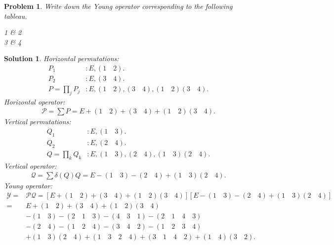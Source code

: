 \documentclass[UTF8,10pt,a4paper]{article}
\theoremstyle{Problem}
\newtheorem{prob}{Problem}
\theoremstyle{Solution}
\newtheorem*{sol}{Solution}
\begin{document}
\begin{prob}
    Write down the Young operator corresponding to the following tableau.\\
    \begin{center}
        \begin{ytableau}
            1 & 2 \\
            3 & 4
        \end{ytableau}
    \end{center}
\end{prob}
\begin{sol}
    Horizontal permutations:
    \begin{align}
        P_1&:E,(1\quad 2).\\
        P_2&:E,(3\quad 4).\\
        P=\prod_jP_j&:E,(1\quad 2),(3\quad 4),(1\quad 2)(3\quad 4).
    \end{align}
    Horizontal operator:
    \begin{align}
        \mathcal{P}=\sum P=E+(1\quad 2)+(3\quad 4)+(1\quad 2)(3\quad 4).
    \end{align}
    Vertical permutations:
    \begin{align}
        Q_1&:E,(1\quad 3).\\
        Q_2&:E,(2\quad 4).\\
        Q=\prod_kQ_k&:E,(1\quad 3),(2\quad 4),(1\quad 3)(2\quad 4).
    \end{align}
    Vertical operator:
    \begin{align}
        \mathcal{Q}=\sum\delta(Q)Q=E-(1\quad 3)-(2\quad 4)+(1\quad 3)(2\quad 4).
    \end{align}
    Young operator:
    \begin{align}
        \mathcal{Y}=&\mathcal{P}\mathcal{Q}=[E+(1\quad 2)+(3\quad 4)+(1\quad 2)(3\quad 4)][E-(1\quad 3)-(2\quad 4)+(1\quad 3)(2\quad 4)]\\
        \nonumber=&E+(1\quad 2)+(3\quad 4)+(1\quad 2)(3\quad 4)\\
        \nonumber&-(1\quad 3)-(2\quad 1\quad 3)-(4\quad 3\quad 1)-(2\quad 1\quad 4\quad 3)\\
        \nonumber&-(2\quad 4)-(1\quad 2\quad 4)-(3\quad 4\quad 2)-(1\quad 2\quad 3\quad 4)\\
        &+(1\quad 3)(2\quad 4)+(1\quad 3\quad 2\quad 4)+(3\quad 1\quad 4\quad 2)+(1\quad 4)(3\quad 2).
    \end{align}
\end{sol}
\end{document}
